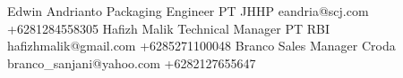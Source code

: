 %
%
%


\begin{referees}
		{Edwin Andrianto}
		{Packaging Engineer}
		{PT JHHP}
		{eandria@scj.com}
		{+6281284558305}
		{Hafizh Malik}
		{Technical Manager}
		{PT RBI}
		{hafizhmalik@gmail.com}
		{+6285271100048}
		{Branco}
		{Sales Manager}
		{Croda}
		{branco\_sanjani@yahoo.com}
		{+6282127655647}
\end{referees}